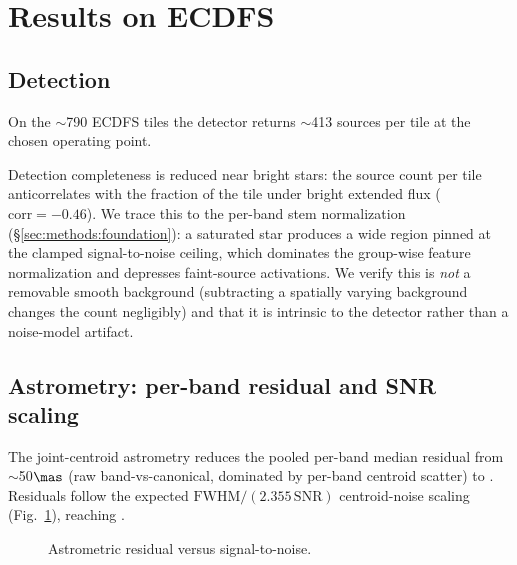 \section{Results on ECDFS}
\label{sec:results}

\subsection{Detection}
\label{sec:results:detection}

On the $\sim$790 ECDFS tiles the detector returns $\sim$413 sources per tile at
the chosen operating point. 

Detection completeness is reduced near bright stars: the source count per tile
anticorrelates with the fraction of the tile under bright extended flux
($\mathrm{corr}=-0.46$). We trace this to the per-band stem normalization
(\S\ref{sec:methods:foundation}): a saturated star produces a wide region
pinned at the clamped signal-to-noise ceiling, which dominates the group-wise
feature normalization and depresses faint-source activations. We verify this is
\emph{not} a removable smooth background (subtracting a spatially varying
background changes the count negligibly) and that it is intrinsic to the
detector rather than a noise-model artifact. 

\subsection{Astrometry: per-band residual and SNR scaling}
\label{sec:results:astro}

The joint-centroid astrometry reduces the pooled per-band median residual from
$\sim$50$\mas$ (raw band-vs-canonical, dominated by per-band centroid scatter)
to . Residuals follow the expected $\mathrm{FWHM}/(2.355\,\mathrm{SNR})$
centroid-noise scaling (Fig.~\ref{fig:snr}), reaching .

\begin{figure}
  \centering
  \caption{Astrometric residual versus signal-to-noise.
    }
  \label{fig:snr}
\end{figure}


